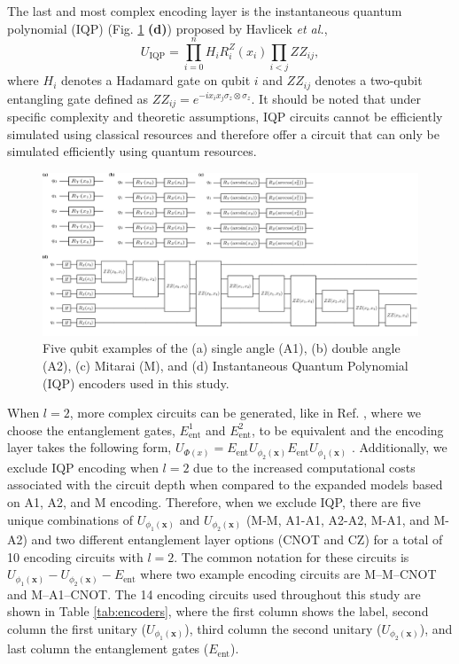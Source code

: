 \documentclass[journal=jacsat,manuscript=article]{achemso}
\begin{document}
The last and most complex encoding layer is the instantaneous quantum polynomial (IQP) (Fig. \ref{fig:encoders} \textbf{(d)}) proposed by Havlicek \textit{et al.}\cite{havlicek_supervised_2019},
\begin{equation}
	U_{\text{IQP}}  = \prod_{i=0}^{n} H_{i} R^{Z}_{i}(x_{i})  \prod_{i<j} ZZ_{ij},
	\label{eq:IQP}
\end{equation}
where $H_{i}$ denotes a Hadamard gate on qubit $i$ and $ZZ_{ij}$ denotes a two-qubit entangling gate defined as $ZZ_{ij} = e^{-i x_{i} x_{j} \sigma_{z} \otimes \sigma_{z}}$.
It should be noted that under specific complexity and theoretic assumptions, IQP circuits cannot be efficiently simulated using classical resources and therefore offer a circuit that can only be simulated efficiently using quantum resources.\cite{lund_quantum_2017,harrow_quantum_2017}

  


  
\begin{figure}[H]
	\centering
	\includegraphics[width=\textwidth]{../images/encoders/quantikz/combined.png}
	\caption{Five qubit examples of the (a) single angle (A1), (b) double angle (A2), (c) Mitarai (M), and (d) Instantaneous Quantum Polynomial (IQP) encoders used in this study.}
	\label{fig:encoders}
\end{figure}

When $l=2$, more complex circuits can be generated, like in Ref. \citep{suzuki_predicting_2020}, where we choose the entanglement gates, $E_{\text{ent}}^{1}$ and $E_{\text{ent}}^{2}$, to be equivalent and the encoding layer takes the following form, $U_{\Phi(x)} =  E_{\text{ent}} U_{\phi_{2}(\mathbf{x})} E_{\text{ent}} U_{\phi_{1}(\mathbf{x})}$ .
Additionally, we exclude IQP encoding when $l=2$ due to the increased computational costs associated with the circuit depth when compared to the expanded models based on A1, A2, and M encoding.
Therefore, when we exclude IQP, there are five unique combinations of $U_{\phi_{1}(\mathbf{x})}$ and $U_{\phi_{2}(\mathbf{x})}$ (M-M, A1-A1, A2-A2, M-A1, and M-A2) and two different entanglement layer options (CNOT and CZ) for a total of 10 encoding circuits with $l=2$.
The common notation for these circuits is $U_{\phi_{1}(\mathbf{x})}-U_{\phi_{2}(\mathbf{x})}-E_{\text{ent}}$ where two example encoding circuits are M--M--CNOT and M--A1--CNOT.
The 14 encoding circuits used throughout this study are shown in Table \ref{tab:encoders}, where the first column shows the label, second column the first unitary ($U_{\phi_{1}(\mathbf{x})}$), third column the second unitary ($U_{\phi_{2}(\mathbf{x})}$), and last column the entanglement gates ($E_{\text{ent}}$).
\end{document}
